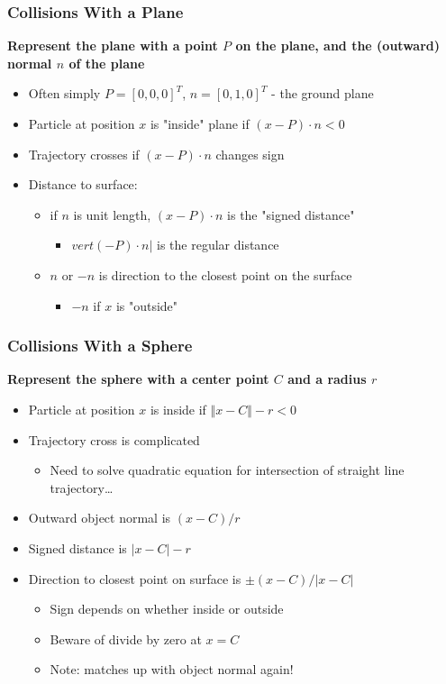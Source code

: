 \documentclass{article}
\begin{document}
\subsubsection*{Collisions With a Plane}
\textbf{Represent the plane with a point $P$ on the plane, and the (outward) normal $n$ of the plane}
\begin{itemize}
    \item Often simply $P = [0, 0, 0]^T$, $n = [0, 1, 0]^T$ - the ground plane
    \item Particle at position $x$ is "inside" plane if $(x - P) \cdot n < 0$
    \item Trajectory crosses if $(x - P) \cdot n$ changes sign
    \item Distance to surface:
    \begin{itemize}
        \item if $n$ is unit length, $(x - P) \cdot n$ is the "signed distance"
        \begin{itemize}
            \item $vert ( - P) \cdot n \vert$ is the regular distance
        \end{itemize}
        \item $n$ or $-n$ is direction to the closest point on the surface
        \begin{itemize}
            \item $-n$ if $x$ is "outside"
        \end{itemize}
    \end{itemize}
\end{itemize}

\subsubsection*{Collisions With a Sphere}
\textbf{Represent the sphere with a center point $C$ and a radius $r$}
\begin{itemize}
    \item Particle at position $x$ is inside if $\Vert x - C \Vert - r < 0$
    \item Trajectory cross is complicated
    \begin{itemize}
        \item Need to solve quadratic equation for intersection of straight line trajectory\dots
    \end{itemize}
    \item Outward object normal is $(x - C) / r$
    \item Signed distance is $\vert x - C \vert - r$
    \item Direction to closest point on surface is $\pm(x - C) / \vert x - C \vert$
    \begin{itemize}
        \item Sign depends on whether inside or outside
        \item Beware of divide by zero at $x = C$
        \item Note: matches up with object normal again!
    \end{itemize}
\end{itemize}
\end{document}
